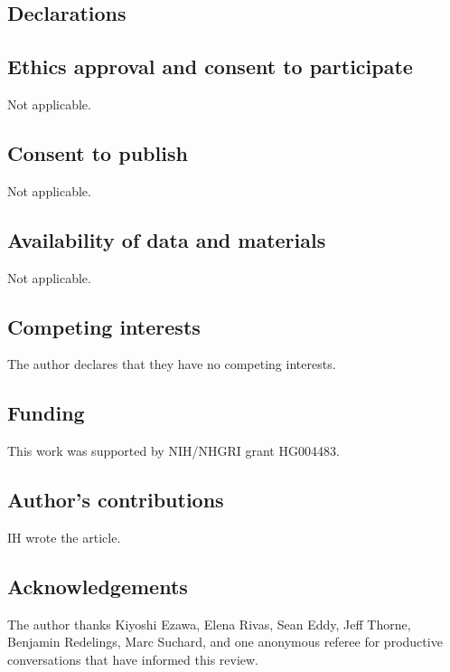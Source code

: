 \documentclass{bmcart}
\begin{document}
\begin{backmatter}

\section*{Declarations}
\subsection*{Ethics approval and consent to participate}
Not applicable.
\subsection*{Consent to publish}
Not applicable.
\subsection*{Availability of data and materials}
Not applicable.
\subsection*{Competing interests}
  The author declares that they have no competing interests.

\subsection*{Funding}
This work was supported by NIH/NHGRI grant HG004483.
\subsection*{Author's contributions}
    IH wrote the article.

\subsection*{Acknowledgements}
  The author thanks Kiyoshi Ezawa, Elena Rivas, Sean Eddy, Jeff Thorne,
  Benjamin Redelings, Marc Suchard, and one anonymous referee
  for productive conversations that have informed this review.


\end{backmatter}
\end{document}
